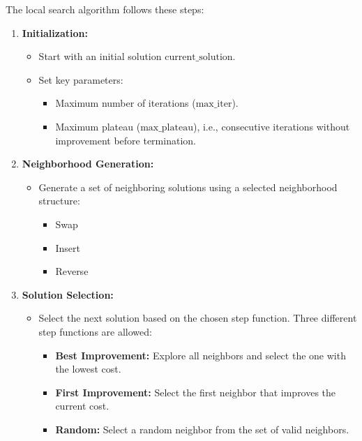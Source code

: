 \documentclass{article}
\begin{document}
The local search algorithm follows these steps:

\begin{enumerate}
    \item \textbf{Initialization:} 
    \begin{itemize}
        \item Start with an initial solution \( \text{current\_solution} \).
        \item Set key parameters:
        \begin{itemize}
            \item Maximum number of iterations (\( \text{max\_iter} \)).
            \item Maximum plateau (\( \text{max\_plateau} \)), i.e., consecutive iterations without improvement before termination.
        \end{itemize}
    \end{itemize}
    
    \item \textbf{Neighborhood Generation:}
    \begin{itemize}
        \item Generate a set of neighboring solutions using a selected neighborhood structure:
        \begin{itemize}
            \item Swap
            \item Insert
            \item Reverse
        \end{itemize}
    \end{itemize}
    
    \item \textbf{Solution Selection:}
    \begin{itemize}
        \item Select the next solution based on the chosen step function. Three different step functions are allowed:
        \begin{itemize}
            \item \textbf{Best Improvement:} Explore all neighbors and select the one with the lowest cost.
            \item \textbf{First Improvement:} Select the first neighbor that improves the current cost.
            \item \textbf{Random:} Select a random neighbor from the set of valid neighbors.
        \end{itemize}
    \end{itemize}
    

\end{enumerate}
\end{document}
